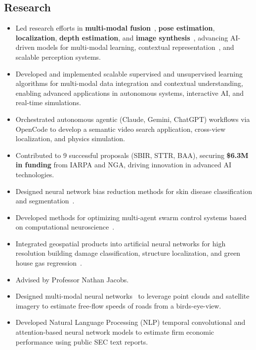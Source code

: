 \documentclass[11pt,a4paper,sans]{moderncv} %
\begin{document}
\subsection{Research}
{
\begin{itemize} 
	\item Led research efforts in \textbf{multi-modal fusion}~\cite{greenwell2024watch}, \textbf{pose estimation}, \textbf{localization}, \textbf{depth estimation}, and \textbf{image synthesis}~\cite{Low2High}, advancing AI-driven models for multi-modal learning, contextual representation~\cite{ProbTraffic}, and scalable perception systems.
	\item Developed and implemented scalable supervised and unsupervised learning algorithms for multi-modal data integration and contextual understanding, enabling advanced applications in autonomous systems, interactive AI, and real-time simulations.
	\item Orchestrated autonomous agentic (Claude, Gemini, ChatGPT) workflows via OpenCode to develop a semantic video search application, cross-view localization, and physics simulation.
	\item Contributed to 9 successful proposals (SBIR, STTR, BAA), securing \textbf{\$6.3M in funding} from IARPA and NGA, driving innovation in advanced AI technologies.
\end{itemize}
}
{
\begin{itemize} 
	\item Designed neural network bias reduction methods for skin disease classification and segmentation~\cite{yuan2023edgemixup, paul2022tara}.
	\item Developed methods for optimizing multi-agent swarm control systems based on computational neuroscience~\cite{hadzic2022100218, buckley2021interdisciplinary}.
	\item Integrated geospatial products into artificial neural networks for high resolution building damage classification, structure localization, and green house gas regression~\cite{mukherjee2021towards}.  
\end{itemize}
}
{
\begin{itemize} 
	\item Advised by Professor Nathan Jacobs.
	\item Designed multi-modal neural networks~\cite{RasterNetpaper, chen2021safety} to leverage point clouds and satellite imagery to estimate free-flow speeds of roads from a birds-eye-view.
	\item Developed Natural Language Processing (NLP) temporal convolutional and attention-based neural network models to estimate firm economic performance using public SEC text reports. 
\end{itemize}
}
\end{document}
